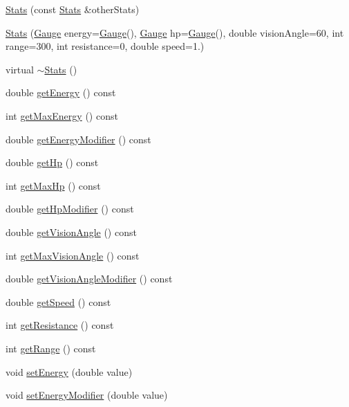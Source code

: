 \begin{DoxyCompactItemize}
\item 
\hyperlink{class_stats_aef9dedc649d8cea5c5d1f67fae7afda2}{Stats} (const \hyperlink{class_stats}{Stats} \&other\+Stats)
\item 
\hyperlink{class_stats_ae902b5f1c452ac374ad706e3df0208f7}{Stats} (\hyperlink{class_gauge}{Gauge} energy=\hyperlink{class_gauge}{Gauge}(), \hyperlink{class_gauge}{Gauge} hp=\hyperlink{class_gauge}{Gauge}(), double vision\+Angle=60, int range=300, int resistance=0, double speed=1.)
\item 
virtual \hyperlink{class_stats_ad32aee12c7d460325f8d7a31159e8acc}{$\sim$\+Stats} ()
\item 
double \hyperlink{class_stats_a30e17d9000d8c8b0a1abadb4e71c8acb}{get\+Energy} () const 
\item 
int \hyperlink{class_stats_a1f32b6a658e466a18dc1bcdc90afd395}{get\+Max\+Energy} () const 
\item 
double \hyperlink{class_stats_af085be8a31d261370cd5f39f37619d21}{get\+Energy\+Modifier} () const 
\item 
double \hyperlink{class_stats_ae33583e210ff57fa7999060bc9b715ea}{get\+Hp} () const 
\item 
int \hyperlink{class_stats_a46b7daf005e24cb8125fb73f9b5dc999}{get\+Max\+Hp} () const 
\item 
double \hyperlink{class_stats_ac15aa8fa55d680cc24788a1afdd53449}{get\+Hp\+Modifier} () const 
\item 
double \hyperlink{class_stats_a9cc6b7d8020ba2e8dd81efa4334682bd}{get\+Vision\+Angle} () const 
\item 
int \hyperlink{class_stats_ab1829a4f57c4bf61935fd81352dd9c08}{get\+Max\+Vision\+Angle} () const 
\item 
double \hyperlink{class_stats_a153b78d961825b56f92522eaeccf7e0c}{get\+Vision\+Angle\+Modifier} () const 
\item 
double \hyperlink{class_stats_ac7e9b7b2587f011edd3607888883af30}{get\+Speed} () const 
\item 
int \hyperlink{class_stats_ac8fe9cd8039ad7abf793c8ac78f0dfd1}{get\+Resistance} () const 
\item 
int \hyperlink{class_stats_ab14084d82bceb1c66af724ec8c99b3cd}{get\+Range} () const 
\item 
void \hyperlink{class_stats_a9b390d667b056c392add8bd16b0b3b18}{set\+Energy} (double value)
\item 
void \hyperlink{class_stats_acc61209a6f195d8425d8d8463c9a5c7e}{set\+Energy\+Modifier} (double value)
\item 

\end{DoxyCompactItemize}
